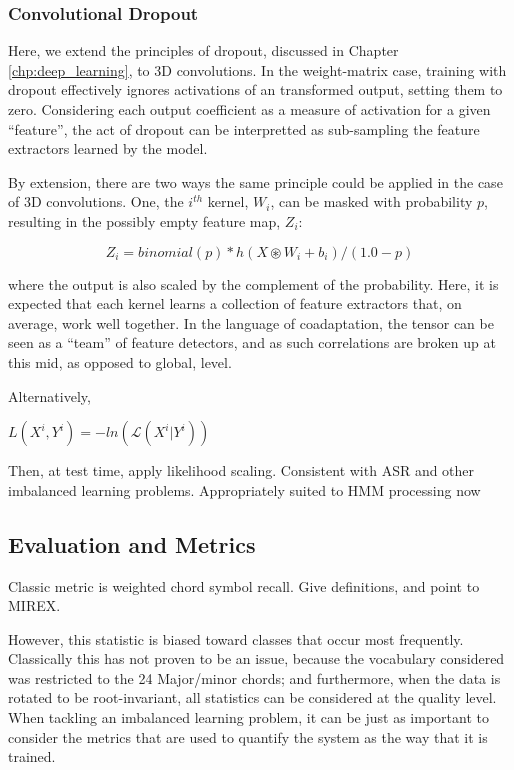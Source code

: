 \subsubsection{Convolutional Dropout}
Here, we extend the principles of dropout, discussed in Chapter \ref{chp:deep_learning}, to 3D convolutions.
In the weight-matrix case, training with dropout effectively ignores activations of an transformed output, setting them to zero.
Considering each output coefficient as a measure of activation for a given ``feature'', the act of dropout can be interpretted as sub-sampling the feature extractors learned by the model.

By extension, there are two ways the same principle could be applied in the case of 3D convolutions.
One, the $i^{th}$ kernel, $W_i$, can be masked with probability $p$, resulting in the possibly empty feature map, $Z_i$:

\begin{equation}
Z_i = binomial(p) * h(X \circledast W_i + b_i) / (1.0 - p)
\end{equation}

\noindent where the output is also scaled by the complement of the probability.
Here, it is expected that each kernel learns a collection of feature extractors that, on average, work well together.
In the language of coadaptation, the tensor can be seen as a ``team'' of feature detectors, and as such correlations are broken up at this mid, as opposed to global, level.

Alternatively,


$L(X^i, Y^i) = -ln(\mathcal{L}(X^i|Y^i))$

Then, at test time, apply likelihood scaling.
Consistent with ASR and other imbalanced learning problems.
Appropriately suited to HMM processing now



\subsection{Evaluation and Metrics}
Classic metric is weighted chord symbol recall.
Give definitions, and point to MIREX.

However, this statistic is biased toward classes that occur most frequently.
Classically this has not proven to be an issue, because the vocabulary considered was restricted to the 24 Major/minor chords; and furthermore, when the data is rotated to be root-invariant, all statistics can be considered at the quality level.
When tackling an imbalanced learning problem, it can be just as important to consider the metrics that are used to quantify the system as the way that it is trained.


